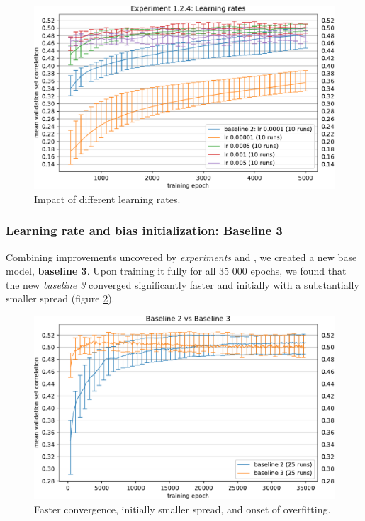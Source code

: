 \begin{figure}[H]
    \centering
    \includegraphics[width=1\textwidth]{../figures/05_1_2_4}
    \caption[Experiment 1.2.4]{Impact of different learning rates.}
    \label{fig:5.1.2.4}
\end{figure}

\subsubsection{Learning rate and bias initialization: Baseline 3}\label{ex:1.2.5}

Combining improvements uncovered by \emph{experiments}  and , we created a new base model, \textbf{baseline 3}. Upon training it fully for all 35 000 epochs, we found that the new \textit{baseline 3} converged significantly faster and initially with a substantially smaller spread (figure \ref{fig:5.1.2.5}). 

\begin{figure}[H]
    \centering
    \includegraphics[width=1\textwidth]{../figures/05_1_2_5}
    \caption[Experiment 1.2.5]{Faster convergence, initially smaller spread, and onset of overfitting.}
    \label{fig:5.1.2.5}
\end{figure}

